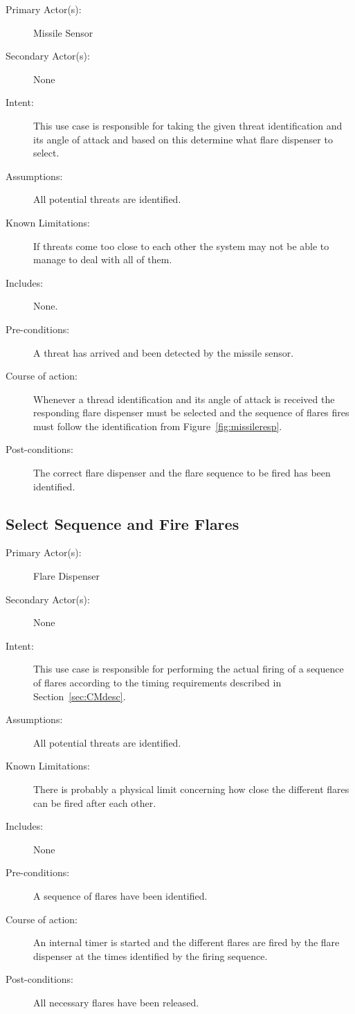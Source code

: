 \documentclass{overturerepchap}
\begin{document}
\begin{description}
\item[Primary Actor(s):] Missile Sensor
\item[Secondary Actor(s):] None
\item[Intent:] This use case is responsible for taking the given
threat identification and its angle of attack and based on this determine 
what flare dispenser to select.
\item[Assumptions:] All potential threats are identified.
\item[Known Limitations:] If threats come too close to each other the
system may not be able to manage to deal with all of them.
\item[Includes:] None.
\item[Pre-conditions:] A threat has arrived and been detected by the
missile sensor.
\item[Course of action:] Whenever a thread identification and its 
angle of attack is received
the responding flare dispenser must be selected and the sequence of 
flares fires must follow the identification from
Figure~\ref{fig:missileresp}.
\item[Post-conditions:] The correct flare dispenser and the flare sequence 
to be fired has been identified.
\end{description}

\subsection{Select Sequence and Fire Flares}

\begin{description}
\item[Primary Actor(s):] Flare Dispenser
\item[Secondary Actor(s):] None
\item[Intent:] This use case is responsible for performing the actual
firing of a sequence of flares according to the timing requirements
described in Section~\ref{sec:CMdesc}.
\item[Assumptions:] All potential threats are identified.
\item[Known Limitations:] There is probably a physical limit
concerning how close the different flares can be fired after each
other.
\item[Includes:] None
\item[Pre-conditions:] A sequence of flares have been identified.
\item[Course of action:] An internal timer is started and the
different flares are fired by the flare dispenser at the times
identified by the firing sequence.
\item[Post-conditions:] All necessary flares have been released.
\end{description}
\end{document}
